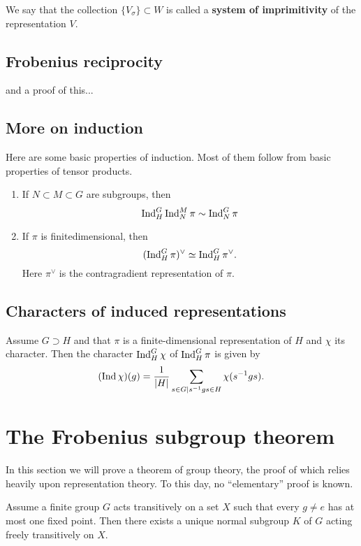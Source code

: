 \documentclass[11pt, english]{article}
\begin{document}
We say that the collection $\{ V_\sigma \}\subset W$  is called a \textbf{system of imprimitivity} of the representation $V$. 

\subsection{Frobenius reciprocity}

and a proof of this...

\subsection{More on induction}

Here are some basic properties of induction. Most of them follow from basic properties of tensor products.

\begin{enumerate}
\item If $N \subset M \subset G$ are subgroups, then
$$
\operatorname{Ind}_H^G \operatorname{Ind}_N^M \pi \sim \operatorname{Ind}_N^G \pi
$$
\item If $\pi$ is finitedimensional, then
$$
(\operatorname{Ind}_H^G \pi)^\vee \simeq \operatorname{Ind}_H^G  \pi^\vee.
$$
Here $\pi^\vee$ is the contragradient representation of $\pi$.
\end{enumerate}

\subsection{Characters of induced representations}

\begin{prop}
 Assume $G \supset H$ and that $\pi$ is a finite-dimensional representation of $H$ and $\chi$ its character. Then the character $\operatorname{Ind}_H^G \chi$ of $\operatorname{Ind}_H^G \pi$ is given by
$$
(\operatorname{Ind} \chi)(g) = \frac{1}{\lvert H \rvert} \sum_{s \in G \mid s^{-1}gs \in H} \chi(s^{-1}gs).
$$
\end{prop}

\section{The Frobenius subgroup theorem}

In this section we will prove a theorem of group theory, the proof of which relies heavily upon representation theory. To this day, no ``elementary'' proof is known.

\begin{thm}
  Assume a finite group $G$ acts transitively on a set $X$ such that every $g \neq e$ has at most one fixed point. Then there exists a unique normal subgroup $K$ of $G$ acting freely transitively on $X$.
\end{thm}
\end{document}
